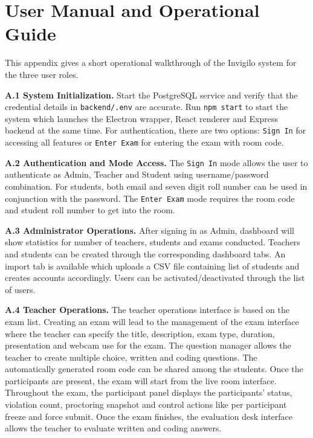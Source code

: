 \documentclass[12pt, a4paper]{report}
\begin{document}
\appendix
\chapter{User Manual and Operational Guide}

\begin{justify}
  {\fontsize{12}{18}\selectfont
    This appendix gives a short operational walkthrough of the Invigilo system for the three user roles.

    \textbf{A.1 System Initialization.} Start the PostgreSQL service and verify that the credential details in \texttt{backend/.env} are accurate. Run \texttt{npm start} to start the system which launches the Electron wrapper, React renderer and Express backend at the same time. For authentication, there are two options: \texttt{Sign In} for accessing all features or \texttt{Enter Exam} for entering the exam with room code.

    \textbf{A.2 Authentication and Mode Access.} The \texttt{Sign In} mode allows the user to authenticate as Admin, Teacher and Student using username/password combination. For students, both email and seven digit roll number can be used in conjunction with the password. The \texttt{Enter Exam} mode requires the room code and student roll number to get into the room.

    \textbf{A.3 Administrator Operations.} After signing in as Admin, dashboard will show statistics for number of teachers, students and exams conducted. Teachers and students can be created through the corresponding dashboard tabs. An import tab is available which uploads a CSV file containing list of students and creates accounts accordingly. Users can be activated/deactivated through the list of users.

    \textbf{A.4 Teacher Operations.} The teacher operations interface is based on the exam list. Creating an exam will lead to the management of the exam interface where the teacher can specify the title, description, exam type, duration, presentation and webcam use for the exam. The question manager allows the teacher to create multiple choice, written and coding questions. The automatically generated room code can be shared among the students. Once the participants are present, the exam will start from the live room interface. Throughout the exam, the participant panel displays the participants' status, violation count, proctoring snapshot and control actions like per participant freeze and force submit. Once the exam finishes, the evaluation desk interface allows the teacher to evaluate written and coding answers.

}
\end{justify}
\end{document}
